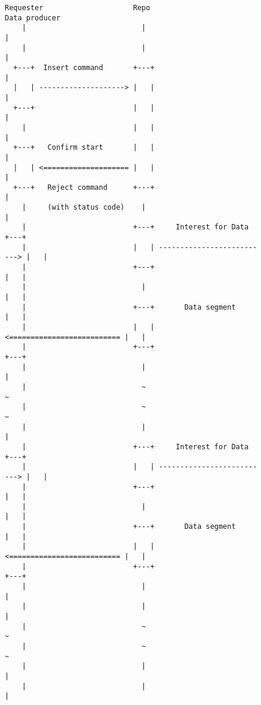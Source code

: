 \begin{figure}[H]
\begin{framed}
\begin{scriptsize}
\begin{verbatim}
Requester                     Repo                          Data producer
    |                           |                                 |
    |                           |                                 |
  +---+  Insert command       +---+                               |
  |   | --------------------> |   |                               |
  +---+                       |   |                               |
    |                         |   |                               |
  +---+   Confirm start       |   |                               |
  |   | <==================== |   |                               |
  +---+   Reject command      +---+                               |
    |     (with status code)    |                                 |
    |                         +---+     Interest for Data       +---+
    |                         |   | --------------------------> |   |
    |                         +---+                             |   |
    |                           |                               |   |
    |                         +---+       Data segment          |   |
    |                         |   | <========================== |   |
    |                         +---+                             +---+
    |                           |                                 |
    |                           ~                                 ~
    |                           ~                                 ~
    |                           |                                 |
    |                         +---+     Interest for Data       +---+
    |                         |   | --------------------------> |   |
    |                         +---+                             |   |
    |                           |                               |   |
    |                         +---+       Data segment          |   |
    |                         |   | <========================== |   |
    |                         +---+                             +---+
    |                           |                                 |
    |                           |                                 |
    |                           ~                                 ~
    |                           ~                                 ~
    |                           |                                 |
    |                           |                                 |

\end{verbatim}
\end{scriptsize}
\end{framed}
\end{figure}
